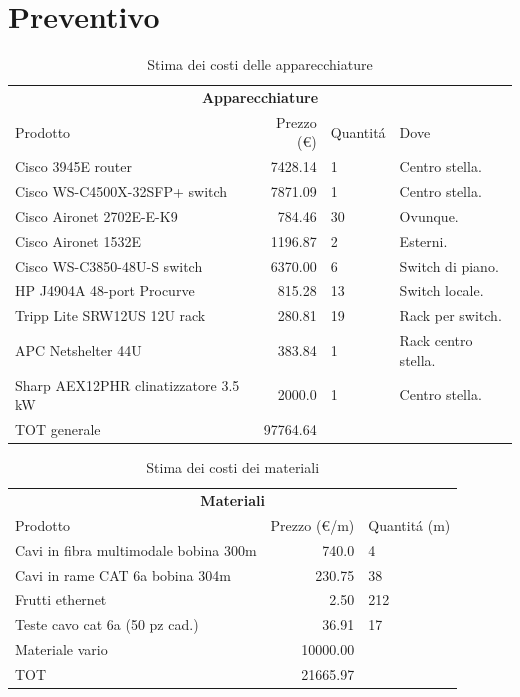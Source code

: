 \documentclass[11pt, a4paper, oneside]{article}
\begin{document}
	\part{Preventivo}
		\begin{table}[h]
			\begin{tabular}{lrll}
				\hline
				\multicolumn{4}{c}{\textbf{Apparecchiature}} \\
				\cline{1-4}
				Prodotto & Prezzo (\euro{}) & Quantit\'a & Dove \\ \hline
				Cisco 3945E router & 7428.14 & 1 & Centro stella. \\
				Cisco WS-C4500X-32SFP+ switch & 7871.09 & 1 & Centro stella. \\
				Cisco Aironet 2702E-E-K9 & 784.46 & 30 & Ovunque. \\
				Cisco Aironet 1532E & 1196.87 & 2 & Esterni. \\
				Cisco WS-C3850-48U-S switch & 6370.00 & 6 & Switch di piano. \\
				HP J4904A 48-port Procurve & 815.28 & 13 & Switch locale. \\
				Tripp Lite SRW12US 12U rack & 280.81 & 19 & Rack per switch. \\
				APC Netshelter 44U & 383.84 & 1 & Rack centro stella. \\
				Sharp AEX12PHR clinatizzatore 3.5 kW & 2000.0 & 1 & Centro stella. \\
				TOT generale & 97764.64 \\
				\hline
			\end{tabular}
			\caption[Costo apparecchiature]{Stima dei costi delle apparecchiature}
		\end{table}
		
		\begin{table}[h]
			\begin{tabular}{lrl}
				\hline
				\multicolumn{3}{c}{\textbf{Materiali}} \\
				\cline{1-3}
				Prodotto & Prezzo (\euro{}/m) & Quantit\'a (m) \\ \hline
				Cavi in fibra multimodale bobina 300m & 740.0 & 4 \\
				Cavi in rame CAT 6a bobina 304m & 230.75 & 38 \\
				Frutti ethernet & 2.50 & 212 \\
				Teste cavo cat 6a (50 pz cad.) & 36.91 & 17 \\
				Materiale vario & 10000.00 \\
				TOT & 21665.97 \\
				\hline
			\end{tabular}
			\caption[Costo materiali]{Stima dei costi dei materiali}
		\end{table}
\end{document}
